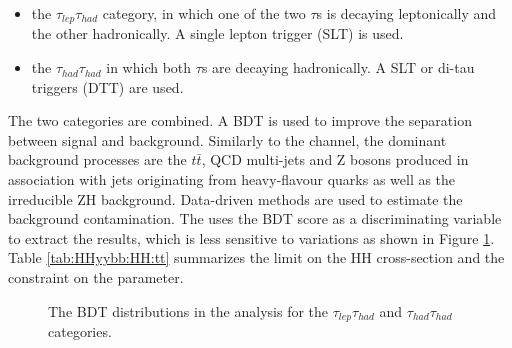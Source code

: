 \begin{itemize}
    \item the $\tau_{lep}\tau_{had}$ category, in which one of the two $\tau$s is decaying leptonically and the other hadronically. A single lepton trigger (SLT) is used.
    \item the $\tau_{had}\tau_{had}$ in which both $\tau$s are decaying hadronically. A SLT or di-tau triggers (DTT) are used.
\end{itemize}
The two categories are combined. A BDT is used to improve the separation between signal and background. Similarly to the \bbbb channel, the dominant background processes are the $t\bar{t}$, QCD multi-jets and Z bosons produced in association with jets originating from heavy-flavour quarks as well as the irreducible ZH background. Data-driven methods are used to estimate the background contamination. The \bbtt uses the BDT score as a discriminating variable to extract the results, which is less sensitive to \kl variations as shown in Figure \ref{fig:HHyybb:HH:tt}. Table \ref{tab:HHyybb:HH:tt} summarizes the limit on the HH cross-section and the constraint on the \kl parameter.

\begin{figure}[htbp]
    \centering
    \caption{The BDT distributions in the \bbtt analysis for the $\tau_{lep}\tau_{had}$ and $\tau_{had}\tau_{had}$ categories.}
    \label{fig:HHyybb:HH:tt}
\end{figure}

